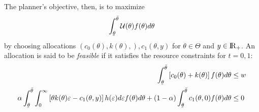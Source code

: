 \documentclass[11pt]{article}
\newcommand{\ubar}[1]{\underaccent{\bar}{#1}}
\newcommand{\R}{{\rm I\!R}}
\newcommand{\U}{\mathcal{U}}
\begin{document}
The planner's objective, then, is to maximize
\begin{equation}
    \int_{\ubar{\theta}}^{\bar{\theta}}\U(\theta)f(\theta)d\theta
\end{equation}
by choosing allocations \( \left( c_0(\theta),k(\theta), \right),c_1(\theta,y) \) for \( \theta\in\Theta \) and \( y\in\R_+ \). An allocation is said to be \textit{feasible} if it satisfies the resource constraints for \( t=0,1 \):
\begin{align}
    \int_{\ubar{\theta}}^{\bar{\theta}} \left[ c_0(\theta) + k(\theta) \right]f(\theta)d\theta &\le w \\
    \alpha\int_{\ubar{\theta}}^{\bar{\theta}}\int_{0}^{\infty}\left[ \theta k(\theta)\varepsilon - c_1(\theta,y) \right]h(\varepsilon)d\varepsilon f(\theta)d\theta + (1-\alpha)\int_{\ubar{\theta}}^{\bar{\theta}}c_1(\theta,0)f(\theta)d\theta &\le 0
\end{align}
\end{document}
